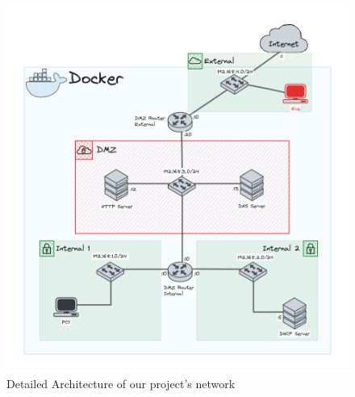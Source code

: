 \documentclass[a4paper,11pt,singlespacing]{article}
\begin{document}
\begin{figure}[bp!]
    \centering
    \includegraphics[width=\textwidth]{images/Diagram1.png}
    \caption{Detailed Architecture of our project's network}
    \label{fig:2}
\end{figure}
\newpage
\end{document}
